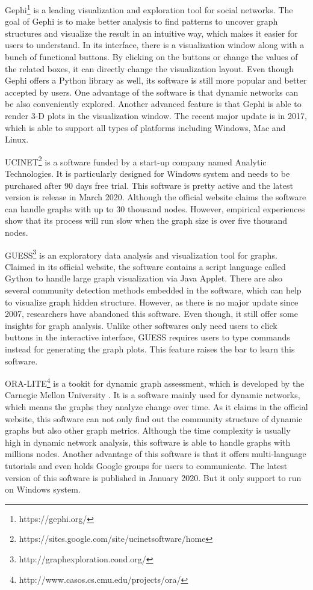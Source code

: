 Gephi\footnote{https://gephi.org/} is a leading visualization and exploration tool for social networks. The goal of Gephi is to make better analysis to find patterns to uncover graph structures and visualize the result in an intuitive way, which makes it easier for users to understand. In its interface, there is a visualization window along with a bunch of functional buttons. By clicking on the buttons or change the values of the related boxes, it can directly change the visualization layout. Even though Gephi offers a Python library as well, its software is still more popular and better accepted by users. One advantage of the software is that dynamic networks can be also conveniently explored. Another advanced feature is that Gephi is able to render 3-D plots in the visualization window. The recent major update is in 2017, which is able to support all types of platforms including Windows, Mac and Linux.

UCINET\footnote{https://sites.google.com/site/ucinetsoftware/home} is a software funded by a start-up company named Analytic Technologies. It is particularly designed for Windows system and needs to be purchased after 90 days free trial. This software is pretty active and the latest version is release in March 2020. Although the official website claims the software can handle graphs with up to 30 thousand nodes. However, empirical experiences show that its process will run slow when the graph size is over five thousand nodes. 

GUESS\footnote{http://graphexploration.cond.org/} is an exploratory data analysis and visualization tool for graphs. Claimed in its official website, the software contains a  script language called Gython to handle large graph visualization via Java Applet. There are also several community detection methods embedded in the software, which can help to visualize graph hidden structure. However, as there is no major update since 2007, researchers have abandoned this software. Even though,  it still offer some  insights for graph analysis. Unlike other softwares only need users to click buttons in the interactive interface,  GUESS requires users  to type commands instead for generating the graph plots. This feature raises the bar to learn this software. 

ORA-LITE\footnote{http://www.casos.cs.cmu.edu/projects/ora/} is a tookit for dynamic graph assessment, which is developed by the Carnegie Mellon University . It is a software mainly used for dynamic networks, which means the graphs they analyze change over time. As it claims in the official website, this software can not only find out the community structure of  dynamic graphs but also other graph metrics. Although  the time complexity is usually high in dynamic network analysis, this software is able to handle graphs with millions nodes. Another advantage of this software is that it offers multi-language tutorials and even holds Google groups for users to communicate. The latest version of this software is published in January 2020. But it only support to run on Windows system.

